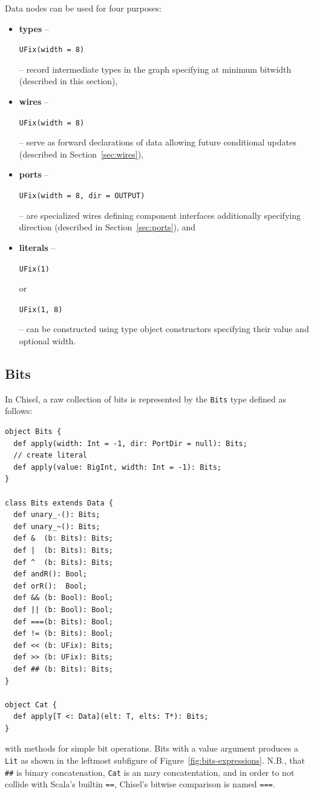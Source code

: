 \documentclass[10pt,twocolumn]{article}
\newcommand{\kode}[1]{\begin{footnotesize}{\tt #1}\end{footnotesize}}
\def\code#1{{\small\tt #1}}
\begin{document}
Data nodes can be used for four purposes:

\begin{itemize}
\item {\bf types} -- \kode{UFix(width = 8)} -- record intermediate types in the graph
  specifying at minimum bitwidth (described in this section), 
\item {\bf wires} -- \kode{UFix(width = 8)} -- serve as forward declarations of data allowing future
  conditional updates (described in Section~\ref{sec:wires}), 
\item {\bf ports} -- \kode{UFix(width = 8, dir = OUTPUT)} -- are specialized wires defining component interfaces
  additionally specifying direction (described in
  Section~\ref{sec:ports}), and
\item{\bf literals} -- \kode{UFix(1)} or \kode{UFix(1, 8)} -- can be constructed using type object
constructors specifying their value and optional width.
\end{itemize}

\subsection{Bits}

In Chisel, a raw collection of bits is represented by the \code{Bits} type defined as follows:

\begin{lstlisting}
object Bits {
  def apply(width: Int = -1, dir: PortDir = null): Bits;
  // create literal
  def apply(value: BigInt, width: Int = -1): Bits;
}

class Bits extends Data {
  def unary_-(): Bits;
  def unary_~(): Bits;
  def &  (b: Bits): Bits;
  def |  (b: Bits): Bits;
  def ^  (b: Bits): Bits;
  def andR(): Bool;
  def orR():  Bool;
  def && (b: Bool): Bool;
  def || (b: Bool): Bool;
  def ===(b: Bits): Bool;
  def != (b: Bits): Bool;
  def << (b: UFix): Bits;
  def >> (b: UFix): Bits;
  def ## (b: Bits): Bits;
}

object Cat {
  def apply[T <: Data](elt: T, elts: T*): Bits;
}
\end{lstlisting}

\noindent
with methods for simple bit operations.  
Bits with a value argument produces a \code{Lit} as shown in the
leftmost subfigure of Figure~\ref{fig:bits-expressions}.
N.B., that \code{\#\#} is binary
concatenation, \code{Cat} is an nary concatentation,
and in order to not collide with Scala's builtin \code{==},
Chisel's bitwise comparison is named \code{===}.
\end{document}

